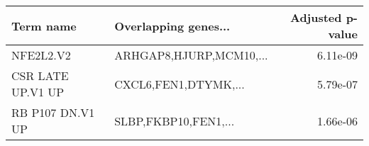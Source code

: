\begin{tabular}{llr}
\toprule
        Term name &    Overlapping genes... &  Adjusted p-value \\
\midrule
        NFE2L2.V2 & ARHGAP8,HJURP,MCM10,... &          6.11e-09 \\
CSR LATE UP.V1 UP &    CXCL6,FEN1,DTYMK,... &          5.79e-07 \\
 RB P107 DN.V1 UP &    SLBP,FKBP10,FEN1,... &          1.66e-06 \\
\bottomrule
\end{tabular}
